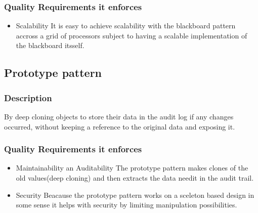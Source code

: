 		\subsubsection{Quality Requirements it enforces}
		\begin{itemize}
			\item Scalability
It is easy to achieve scalability with the blackboard pattern accross a grid of processors subject to having a scalable implementation of the blackboard itsself.
		\end{itemize}	
		
	\subsection{Prototype pattern}
		\subsubsection{Description}
 			By deep cloning objects to store their data in the audit log if any changes occurred, without keeping a reference to the original data and exposing it.
		\subsubsection{Quality Requirements it enforces}
		\begin{itemize}
			\item Maintainability an Auditability
The prototype pattern makes clones of the old values(deep cloning) and then extracts the data needit in the audit trail.
			\item Security
Beacause the prototype pattern works on a sceleton based design in some sense it helps with security by limiting manipulation possibilities.

		\end{itemize}	